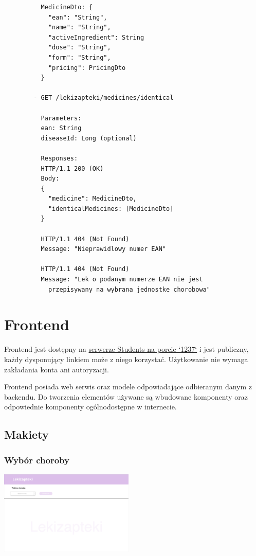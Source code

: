 \documentclass{article}
\begin{document}
    \begin{minipage}{.45\textwidth}
      \begin{lstlisting}
          MedicineDto: {
            "ean": "String",
            "name": "String",
            "activeIngredient": String
            "dose": "String",
            "form": "String",
            "pricing": PricingDto
          }

        - GET /lekizapteki/medicines/identical

          Parameters:
          ean: String
          diseaseId: Long (optional)

          Responses:
          HTTP/1.1 200 (OK)
          Body:
          {
            "medicine": MedicineDto,
            "identicalMedicines: [MedicineDto]
          }

          HTTP/1.1 404 (Not Found)
          Message: "Nieprawidlowy numer EAN"

          HTTP/1.1 404 (Not Found)
          Message: "Lek o podanym numerze EAN nie jest
            przepisywany na wybrana jednostke chorobowa"
      \end{lstlisting}
    \end{minipage}

  \section{Frontend}
  Frontend jest dostępny na
  \href{http://students.mimuw.edu.pl:1237}{serwerze Students na porcie `1237`} i jest publiczny,
  każdy dysponujący linkiem może z niego korzystać.
  Użytkowanie nie wymaga zakładania konta ani autoryzacji.

  Frontend posiada web serwis oraz modele odpowiadające odbieranym danym z backendu.
  Do tworzenia elementów używane są wbudowane komponenty oraz odpowiednie komponenty ogólnodostępne w internecie.

    \subsection{Makiety}
      \subsubsection{Wybór choroby}
      \includegraphics[width=6.4cm, height=4cm]{lekizapteki-wybor-choroby}
\end{document}
